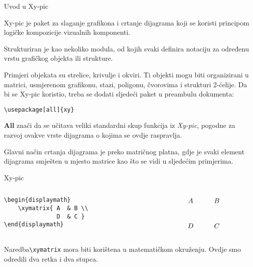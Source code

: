 \begin{frame}{Uvod u Xy-pic}

Xy-pic je paket za slaganje grafikona i crtanje dijagrama koji se koristi principom logičke kompozicije vizualnih komponenti.\newline

Strukturiran je kao nekoliko modula, od kojih svaki definira notaciju za određenu vrstu grafičkog objekta ili strukture.\newline

Primjeri objekata su strelice, krivulje i okviri. Ti objekti mogu biti organizirani u matrici, usmjerenom grafikonu, stazi, poligonu, čvorovima i strukturi 2-ćelije.\newpage
Da bi se Xy-pic koristio, treba se dodati sljedeći paket u preambulu dokumenta:

\begin{verbatim}
\usepackage[all]{xy}
\end{verbatim}
\textbf{All} znači da se učitava veliki standardni skup funkcija iz \textit{Xy-pic}, pogodne za razvoj ovakve vrste dijagrama o kojima se ovdje raspravlja. \newline

Glavni način crtanja dijagrama je preko matričnog platna, gdje je svaki element dijagrama smješten u mjesto matrice kao što se vidi u sljedećim primjerima.
\end{frame}

\begin{frame}{Xy-pic}

\begin{columns}[c]

\begin{column}{0.5\textwidth}

\begin{verbatim}
\begin{displaymath}
    \xymatrix{ A  & B \\
               D  & C }
\end{displaymath}
\end{verbatim}

\end{column}

\begin{column}{0.5\textwidth}%

\begin{displaymath}
    \xymatrix{ A  & B \\
               D  & C  }
\end{displaymath}

\end{column}

\end{columns}
\mbox{}
\newline

Naredba\verb|\xymatrix| mora biti korištena u matematičkom okruženju. Ovdje smo odredili dva retka i dva stupca.\newpage
\end{frame}

